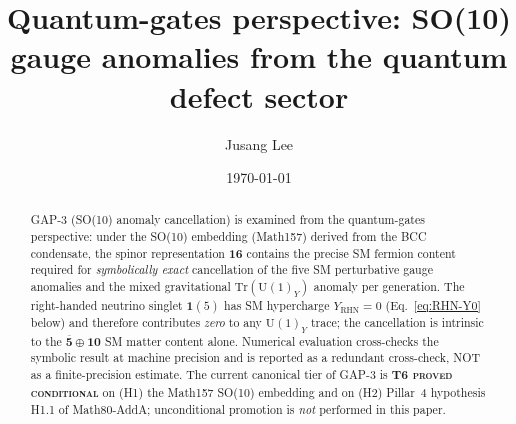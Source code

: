 



\title{Quantum-gates perspective: SO(10) gauge anomalies from the quantum
defect sector}

\author{Jusang Lee}

\date{\today}

\begin{abstract}
GAP-3 (SO(10) anomaly cancellation) is examined from the
quantum-gates perspective: under the SO(10) embedding (Math157)
derived from the BCC condensate, the spinor representation
$\mathbf{16}$ contains the precise SM fermion content required for
\emph{symbolically exact} cancellation of the five SM perturbative
gauge anomalies and the mixed gravitational
$\mathrm{Tr}(\mathrm{U}(1)_Y)$ anomaly per generation. The
right-handed neutrino singlet $\mathbf{1}(5)$ has SM hypercharge
$Y_{\mathrm{RHN}} = 0$ (Eq.~\eqref{eq:RHN-Y0} below) and therefore
contributes \emph{zero} to any $\mathrm{U}(1)_Y$ trace; the
cancellation is intrinsic to the
$\overline{\mathbf{5}}\oplus\mathbf{10}$ SM matter content alone.
Numerical evaluation cross-checks the symbolic result at machine
precision and is reported as a redundant cross-check, NOT as a
finite-precision estimate. The current canonical tier of GAP-3 is
\textbf{T6 \textsc{proved conditional}} on (H1) the Math157 SO(10)
embedding and on (H2) Pillar~4 hypothesis H1.1 of Math80-AddA;
unconditional promotion is \emph{not} performed in this paper.
\end{abstract}

